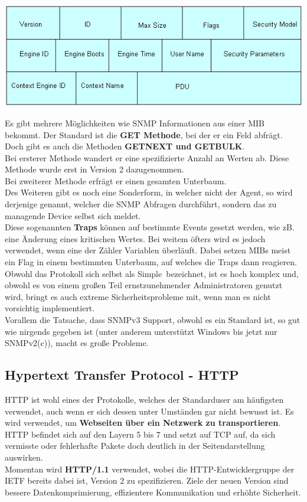 \documentclass[12pt,a4paper]{report}
\begin{document}
\begin{onehalfspace}
\begin{center}
\includegraphics[scale=0.7]{../docs/tarkes/pics/snmpheader.jpg}
\end{center}

Es gibt mehrere Möglichkeiten wie SNMP Informationen aus einer MIB bekommt. Der Standard ist die \textbf{GET Methode}, bei der er ein Feld abfrägt. Doch gibt es auch die Methoden \textbf{GETNEXT und GETBULK}.\\
Bei ersterer Methode wandert er eine spezifizierte Anzahl an Werten ab. Diese Methode wurde erst in Version 2 dazugenommen.\\
Bei zweiterer Methode erfrägt er einen gesamten Unterbaum.\\

Des Weiteren gibt es noch eine Sonderform, in welcher nicht der Agent, so wird derjenige genannt, welcher die SNMP Abfragen durchführt, sondern das zu managende Device selbst sich meldet.\\
Diese sogenannten \textbf{Traps} können auf bestimmte Events gesetzt werden, wie zB. eine Änderung eines kritischen Wertes. Bei weitem öfters wird es jedoch verwendet, wenn eine der Zähler Variablen überläuft. Dabei setzen MIBs meist ein Flag in einem bestimmten Unterbaum, auf welches die Traps dann reagieren.\\

Obwohl das Protokoll sich selbst als \glqq Simple\grqq \ bezeichnet, ist es hoch komplex und, obwohl es von einem großen Teil ernstzunehmender Administratoren genutzt wird, bringt es auch extreme Sicherheitsprobleme mit, wenn man es nicht vorsichtig implementiert.\\
Vorallem die Tatsache, dass SNMPv3 Support, obwohl es ein Standard ist, so gut wie nirgends gegeben ist (unter anderem unterstützt Windows bis jetzt nur SNMPv2(c)), macht es große Probleme. 
\subsection{Hypertext Transfer Protocol - HTTP}
HTTP ist wohl eines der Protokolle, welches der Standarduser am häufigsten verwendet, auch wenn er sich dessen unter Umständen gar nicht bewusst ist. Es wird verwendet, um \textbf{Webseiten über ein Netzwerk zu transportieren}. HTTP befindet sich auf den Layern 5 bis 7 und setzt auf TCP auf, da sich vermisste oder fehlerhafte Pakete doch deutlich in der Seitendarstellung auswirken.\\
Momentan wird \textbf{HTTP/1.1} verwendet, wobei die HTTP-Entwicklergruppe der IETF bereits dabei ist, Version 2 zu spezifizieren. Ziele der neuen Version sind bessere Datenkomprimierung, effizientere Kommunikation und erhöhte Sicherheit.\\


\end{onehalfspace}
\end{document}
